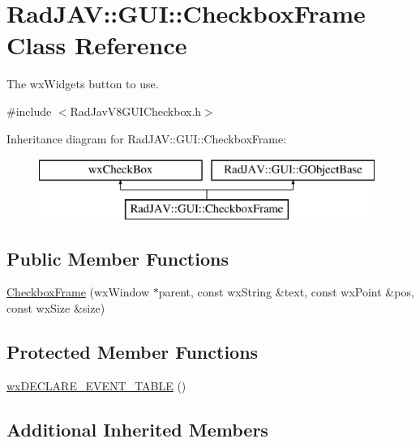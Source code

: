 \hypertarget{class_rad_j_a_v_1_1_g_u_i_1_1_checkbox_frame}{}\section{Rad\+J\+AV\+:\+:G\+UI\+:\+:Checkbox\+Frame Class Reference}
\label{class_rad_j_a_v_1_1_g_u_i_1_1_checkbox_frame}


The wx\+Widgets button to use.  




{\ttfamily \#include $<$Rad\+Jav\+V8\+G\+U\+I\+Checkbox.\+h$>$}

Inheritance diagram for Rad\+J\+AV\+:\+:G\+UI\+:\+:Checkbox\+Frame\+:\begin{figure}[H]
\begin{center}
\leavevmode
\includegraphics[height=2.000000cm]{class_rad_j_a_v_1_1_g_u_i_1_1_checkbox_frame}
\end{center}
\end{figure}
\subsection*{Public Member Functions}
\begin{DoxyCompactItemize}
\item 
\mbox{\hyperlink{class_rad_j_a_v_1_1_g_u_i_1_1_checkbox_frame_a1805410be8411354eea13004fcd2262d}{Checkbox\+Frame}} (wx\+Window $\ast$parent, const wx\+String \&text, const wx\+Point \&pos, const wx\+Size \&size)
\end{DoxyCompactItemize}
\subsection*{Protected Member Functions}
\begin{DoxyCompactItemize}
\item 
\mbox{\hyperlink{class_rad_j_a_v_1_1_g_u_i_1_1_checkbox_frame_a947125155d49fcfc7da49336e05e576a}{wx\+D\+E\+C\+L\+A\+R\+E\+\_\+\+E\+V\+E\+N\+T\+\_\+\+T\+A\+B\+LE}} ()
\end{DoxyCompactItemize}
\subsection*{Additional Inherited Members}


